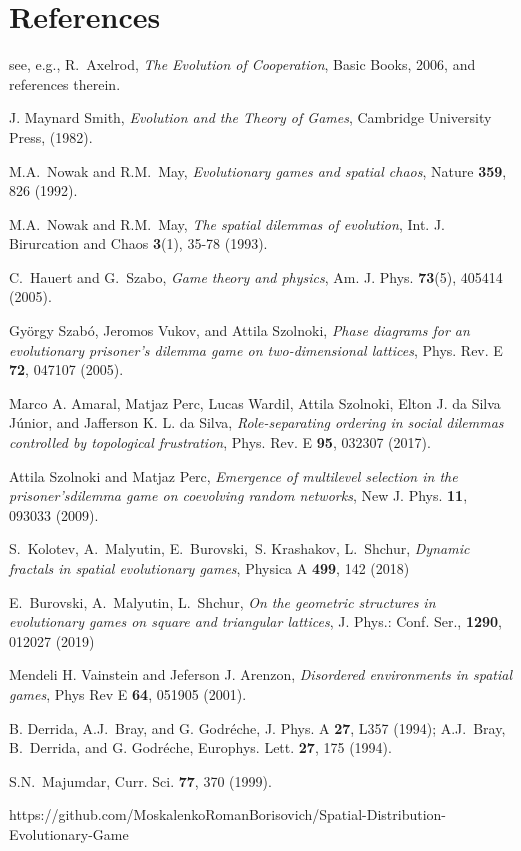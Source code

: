 \documentclass[a4paper]{jpconf}
\begin{document}
\section*{References}
\begin{thebibliography}{9}

 see, e.g., R.~Axelrod, \textit{The Evolution of Cooperation}, Basic Books,
2006, and references therein.

 J. Maynard Smith, \textit{Evolution and the Theory of Games},
Cambridge University Press, (1982).

 M.A.~Nowak and R.M.~May, \textit{Evolutionary games
and spatial chaos}, Nature \textbf{359}, 826 (1992).

 M.A.~Nowak and R.M.~May, \textit{The spatial
dilemmas of evolution}, Int. J. Birurcation and Chaos \textbf{3}(1), 35-78 (1993).

 C.~Hauert and G.~Szabo, \textit{Game theory and physics},
Am. J. Phys. \textbf{73}(5), 405414 (2005).


 Gy\"{o}rgy Szab\'{o}, Jeromos Vukov, and Attila Szolnoki, \textit{Phase diagrams for an evolutionary prisoner’s dilemma game on two-dimensional lattices}, Phys. Rev. E \textbf{72}, 047107 (2005).

 Marco A. Amaral, Matjaz Perc,  Lucas Wardil, Attila Szolnoki, Elton J. da Silva J\'{u}nior, and Jafferson K. L. da Silva, \textit{Role-separating ordering in social dilemmas controlled by topological frustration}, Phys. Rev. E \textbf{95}, 032307 (2017).

 Attila Szolnoki and Matjaz Perc, \textit{Emergence of multilevel selection in the prisoner’sdilemma game on coevolving random networks}, New J. Phys. \textbf{11}, 093033 (2009).

 S.~Kolotev, A.~Malyutin, E.~Burovski,~S. Krashakov, L.~Shchur, \textit{Dynamic fractals in spatial evolutionary games}, Physica A  \textbf{499}, 142 (2018)

 E.~Burovski, A.~Malyutin, L.~Shchur, \textit{On the geometric structures in evolutionary games on square and triangular lattices}, J. Phys.: Conf. Ser., \textbf{1290}, 012027 (2019) 

  Mendeli H. Vainstein and Jeferson J. Arenzon, \textit{Disordered environments in spatial games}, Phys Rev E \textbf{64}, 051905 (2001).

 B. Derrida, A.J.~Bray, and G. Godr\'{e}che, J. Phys. A \textbf{27}, L357 (1994); A.J.~Bray, B.~Derrida, and G. Godr\'{e}che, Europhys. Lett. \textbf{27}, 175 (1994).

 S.N.~Majumdar, Curr. Sci. \textbf{77}, 370 (1999).

 https://github.com/MoskalenkoRomanBorisovich/Spatial-Distribution-Evolutionary-Game 


\end{thebibliography}
\end{document}
